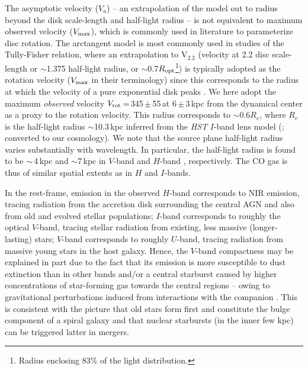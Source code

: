 \documentclass[]{emulateapj}
\begin{document}
The asymptotic velocity ($V_{a}$) -- an extrapolation of the model
out to radius beyond the disk scale-length and half-light radius --
is not equivalent to maximum observed velocity ($V_{\rm max}$),
which is commonly used in literature to parameterize disc rotation.
The arctangent model is most commonly used in studies of the
Tully-Fisher relation, where an extrapolation to V$_{2.2}$ (velocity
at 2.2 disc scale-length or $\sim$1.375 half-light radius,
or $\sim$0.7$R_{\rm opt}$\footnote{Radius enclosing 83\% of the light
distribution.}) is typically adopted
as the rotation velocity ($V_{\rm max}$ in their
terminology) since this corresponds to the radius at which the velocity
of a pure exponential disk peaks \citep{Courteau97b}.
We here adopt the maximum {\em observed} velocity
$V_{\rm rot}$\,=\,345\,$\pm$\,55\,\kms at 6\,$\pm$\,3\,kpc from the %
dynamical center as a proxy to the rotation velocity.
This radius corresponds to $\sim$0.6$R_e$, where $R_e$ is the half-light
radius $\sim$10.3\,kpc inferred from the {\it HST} $I$-band
lens model (; converted to
our cosmology).
We note that the source plane half-light radius varies substantially with
wavelength. In particular, the half-light radius is found to be
$\sim$\,4\,kpc and $\sim$7\,kpc in $V$-band
 and $H$-band , respectively.
The CO gas is thus of similar spatial
extents as in $H$ and $I$-bands.

In the rest-frame,
emission in the observed $H$-band corresponds to NIR emission,
tracing radiation from the accretion disk surrounding
the central AGN and also from old and evolved stellar populations;
$I$-band corresponds to roughly the optical $V$-band, tracing stellar radiation from
existing, less massive (\ie longer-lasting) stars;
$V$-band corresponds to roughly $U$-band,  tracing radiation from massive young stars
in the host galaxy. Hence,
the $V$-band compactness may be explained in part
due to the fact that its emission is
more susceptible to dust extinction than in other bands and/or
a central starburst caused by higher
concentrations of star-forming gas towards the central regions -- owing to
gravitational perturbations induced
from interactions with the companion
\citep[\eg][]{DiMatteo05a}.
This is consistent with the picture that old stars form first and constitute the bulge component
of a spiral galaxy and that nuclear starbursts (in the inner few kpc) can be triggered latter in mergers.
\end{document}
